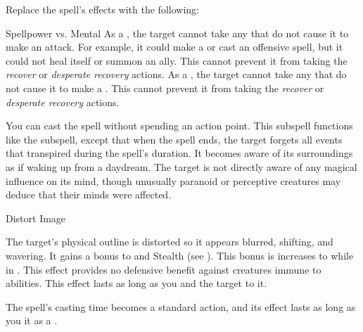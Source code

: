 Replace the spell's effects with the following:
\begin{spellcontent}
\begin{augmenteffects}
\begin{spellattack}{Spellpower vs. Mental}
\spellsuccess
As a , the target cannot take any  that do not cause it to make an attack.
For example, it could make a  or cast an offensive spell, but it could not heal itself or summon an ally.
This cannot prevent it from taking the \textit{recover} or \textit{desperate recovery} actions.
\spellcritical
As a , the target cannot take any  that do not cause it to make a .
This cannot prevent it from taking the \textit{recover} or \textit{desperate recovery} actions.
\end{spellattack}
\end{augmenteffects}
\end{spellcontent}
You can cast the spell without spending an action point.
This subspell functions like the  subspell, except that when the spell ends, the target forgets all events that transpired during the spell's duration.
It becomes aware of its surroundings as if waking up from a daydream.
The target is not directly aware of any magical influence on its mind, though unusually paranoid or perceptive creatures may deduce that their minds were affected.
\begin{spellsection}{Distort Image}
\begin{spellcontent}
\begin{spelltargetinginfo}
\end{spelltargetinginfo}
\begin{spelleffects}
\spelleffect
The target's physical outline is distorted so it appears blurred, shifting, and wavering.
It gains a  bonus to  and Stealth (see ).
This bonus is increases to  while in .
This effect provides no defensive benefit against creatures immune to  abilities.
This effect lasts as long as you and the target  to it.
\end{spelleffects}
\end{spellcontent}
\begin{spellfooter}
\end{spellfooter}
\begin{spellsubcontent}
\begin{spellcantrip}
The spell's casting time becomes a standard action, and its effect lasts as long as you  it as a .
\end{spellcantrip}
\end{spellsubcontent}
\end{spellsection}
